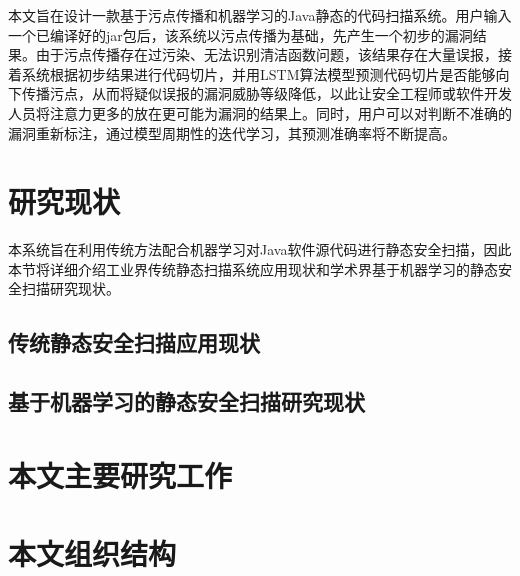 本文旨在设计一款基于污点传播和机器学习的Java静态的代码扫描系统。用户输入一个已编译好的jar包后，该系统以污点传播为基础，先产生一个初步的漏洞结果。由于污点传播存在过污染、无法识别清洁函数问题，该结果存在大量误报，接着系统根据初步结果进行代码切片，并用LSTM算法模型预测代码切片是否能够向下传播污点，从而将疑似误报的漏洞威胁等级降低，以此让安全工程师或软件开发人员将注意力更多的放在更可能为漏洞的结果上。同时，用户可以对判断不准确的漏洞重新标注，通过模型周期性的迭代学习，其预测准确率将不断提高。

\section{研究现状}
本系统旨在利用传统方法配合机器学习对Java软件源代码进行静态安全扫描，因此本节将详细介绍工业界传统静态扫描系统应用现状和学术界基于机器学习的静态安全扫描研究现状。\\

\subsection{传统静态安全扫描应用现状}

\subsection{基于机器学习的静态安全扫描研究现状}

\section{本文主要研究工作}


\section{本文组织结构}